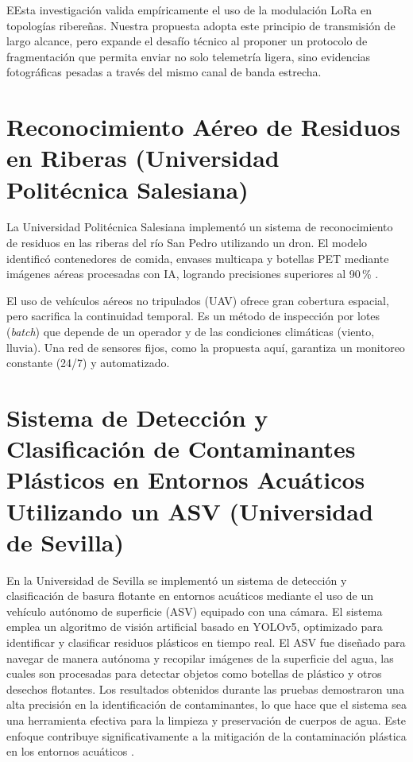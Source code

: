 EEsta investigación valida empíricamente el uso de la modulación LoRa en topologías ribereñas. Nuestra propuesta adopta este principio de transmisión de largo alcance, pero expande el desafío técnico al proponer un protocolo de fragmentación que permita enviar no solo telemetría ligera, sino evidencias fotográficas pesadas a través del mismo canal de banda estrecha.

\section{Reconocimiento Aéreo de Residuos en Riberas (Universidad Politécnica Salesiana)}

La Universidad Politécnica Salesiana implementó un sistema de reconocimiento de residuos en las riberas del río San Pedro utilizando un dron. El modelo identificó contenedores de comida, envases multicapa y botellas PET mediante imágenes aéreas procesadas con IA, logrando precisiones superiores al 90\,\% \cite{ortega2024}.

El uso de vehículos aéreos no tripulados (UAV) ofrece gran cobertura espacial, pero sacrifica la continuidad temporal. Es un método de inspección por lotes (\textit{batch}) que depende de un operador y de las condiciones climáticas (viento, lluvia). Una red de sensores fijos, como la propuesta aquí, garantiza un monitoreo constante (24/7) y automatizado.

\section{Sistema de Detección y Clasificación de Contaminantes Plásticos en Entornos Acuáticos Utilizando un ASV (Universidad de Sevilla)}

En la Universidad de Sevilla se implementó un sistema de detección y clasificación de basura flotante en entornos acuáticos mediante el uso de un vehículo autónomo de superficie (ASV) equipado con una cámara. El sistema emplea un algoritmo de visión artificial basado en YOLOv5, optimizado para identificar y clasificar residuos plásticos en tiempo real. El ASV fue diseñado para navegar de manera autónoma y recopilar imágenes de la superficie del agua, las cuales son procesadas para detectar objetos como botellas de plástico y otros desechos flotantes. Los resultados obtenidos durante las pruebas demostraron una alta precisión en la identificación de contaminantes, lo que hace que el sistema sea una herramienta efectiva para la limpieza y preservación de cuerpos de agua. Este enfoque contribuye significativamente a la mitigación de la contaminación plástica en los entornos acuáticos \cite{fernandez2024}.

